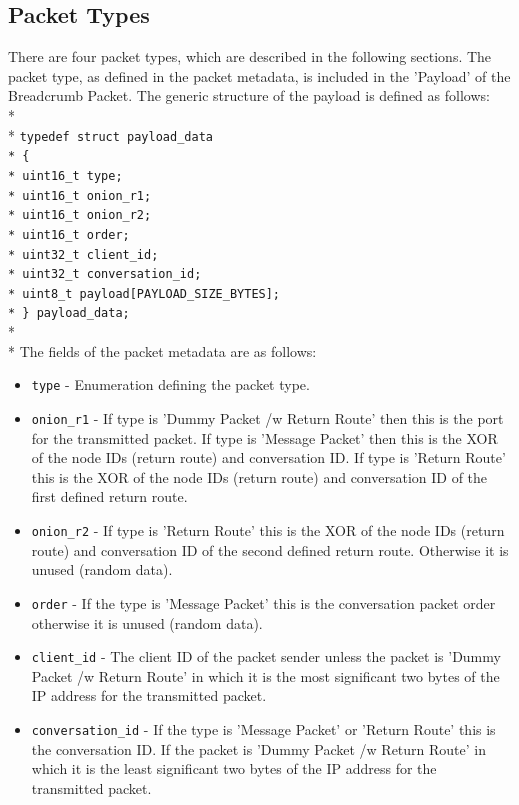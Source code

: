 \documentclass{article}
\begin{document}
\subsection{Packet Types}
There are four packet types, which are described in the following sections. The packet type, as defined in the packet metadata, is included in the 'Payload' of the Breadcrumb Packet. The generic structure of the payload is defined as follows:\\*\\*
\texttt{\-\hspace{1cm}typedef struct payload\_data\\*
\-\hspace{1cm}\{\\*
\-\hspace{2cm}uint16\_t type;\\*
\-\hspace{2cm}uint16\_t onion\_r1;\\*
\-\hspace{2cm}uint16\_t onion\_r2;\\*
\-\hspace{2cm}uint16\_t order;\\*
\-\hspace{2cm}uint32\_t client\_id;\\*
\-\hspace{2cm}uint32\_t conversation\_id;\\*
\-\hspace{2cm}uint8\_t payload[PAYLOAD\_SIZE\_BYTES];\\*
\-\hspace{1cm}\} payload\_data;}\\*\\*
The fields of the packet metadata are as follows:
\begin{itemize}
	\item \texttt{type} - Enumeration defining the packet type.
	\item \texttt{onion\_r1} - If type is 'Dummy Packet /w Return Route' then this is the port for the transmitted packet. If type is 'Message Packet' then this is the XOR of the node IDs (return route) and conversation ID. If
	type is 'Return Route' this is the XOR of the node IDs (return route) and conversation ID of the first defined return route.
	\item \texttt{onion\_r2} - If type is 'Return Route' this is the XOR of the node IDs (return route) and conversation ID of the second defined return route. Otherwise it is unused (random data).
	\item \texttt{order} - If the type is 'Message Packet' this is the conversation packet order otherwise it is unused (random data).
	\item \texttt{client\_id} - The client ID of the packet sender unless the packet is 'Dummy Packet /w Return Route' in which it is the most significant two bytes of the IP address for the transmitted packet.
	\item \texttt{conversation\_id} - If the type is 'Message Packet' or 'Return Route' this is the conversation ID. If the packet is 'Dummy Packet /w Return Route' in which it is the least significant two bytes of the IP address for the transmitted packet.
\end{itemize}
\end{document}
